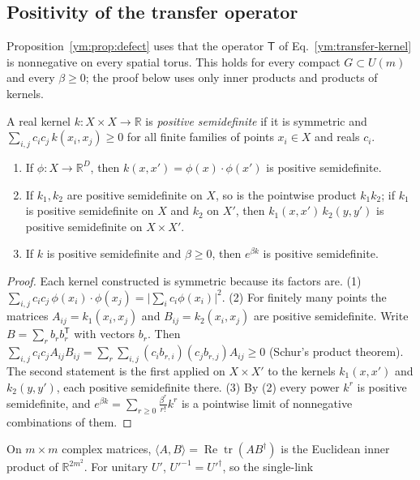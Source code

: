 \subsection{Positivity of the transfer operator}\label{ym:sc-positivity}
Proposition~\ref{ym:prop:defect} uses that the operator $\mathsf T$ of
Eq.~\eqref{ym:transfer-kernel} is nonnegative on every spatial torus. This
holds for every compact $G\subset U(m)$ and every $\beta\ge0$; the proof below
uses only inner products and products of kernels.

A real kernel $k\colon X\times X\to\mathbb R$ is \emph{positive semidefinite}
if it is symmetric and $\sum_{i,j}c_ic_j\,k(x_i,x_j)\ge0$ for all finite families of points
$x_i\in X$ and reals $c_i$.
\begin{lemma}\label{ym:sc-lem:schur}
\begin{enumerate}
\item If $\phi\colon X\to\mathbb R^D$, then $k(x,x')=\phi(x)\cdot\phi(x')$ is
 positive semidefinite.
\item If $k_1,k_2$ are positive semidefinite on $X$, so is the pointwise
 product $k_1k_2$; if $k_1$ is positive semidefinite on $X$ and $k_2$ on $X'$,
 then $k_1(x,x')\,k_2(y,y')$ is positive semidefinite on $X\times X'$.
\item If $k$ is positive semidefinite and $\beta\ge0$, then $e^{\beta k}$ is
 positive semidefinite.
\end{enumerate}
\end{lemma}
\begin{proof}
Each kernel constructed is symmetric because its factors are. (1)
$\sum_{i,j}c_ic_j\,\phi(x_i)\cdot\phi(x_j)=\big|\sum_ic_i\phi(x_i)\big|^2$.
(2) For finitely many points the matrices $A_{ij}=k_1(x_i,x_j)$ and
$B_{ij}=k_2(x_i,x_j)$ are positive semidefinite. Write
$B=\sum_r b_rb_r^{\mathsf T}$ with vectors $b_r$. Then
$\sum_{i,j}c_ic_jA_{ij}B_{ij}=\sum_r\sum_{i,j}(c_ib_{r,i})(c_jb_{r,j})A_{ij}
\ge0$ (Schur's product theorem). The second statement is the first applied on
$X\times X'$ to the kernels $k_1(x,x')$ and $k_2(y,y')$, each positive
semidefinite there. (3) By (2) every power $k^r$ is positive semidefinite, and
$e^{\beta k}=\sum_{r\ge0}\frac{\beta^r}{r!}k^r$ is a pointwise limit of
nonnegative combinations of them.
\end{proof}
On $m\times m$ complex matrices, $\langle A,B\rangle=\operatorname{Re}
\operatorname{tr}(AB^\dagger)$ is the Euclidean inner product of
$\mathbb R^{2m^2}$. For unitary $U'$, $U'^{-1}=U'^\dagger$, so the single-link
